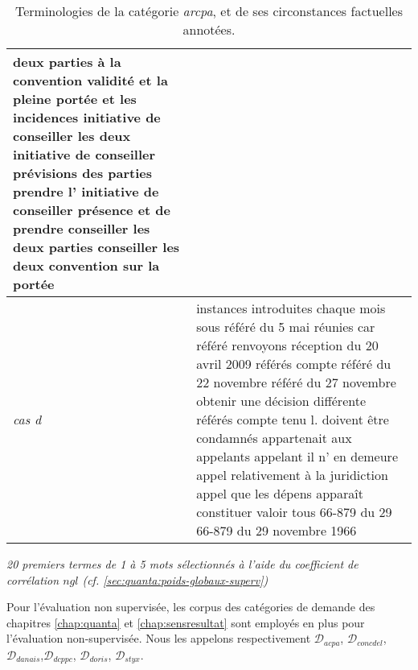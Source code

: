 \begin{table}[h]
\begin{tabular}{|l|p{}|}
		deux parties à la convention
		validité et la pleine
		portée et les incidences
		initiative de conseiller les deux
		initiative de conseiller
		prévisions des parties
		prendre l' initiative de conseiller
		présence et de prendre
		conseiller les deux parties
		conseiller les deux
		convention sur la portée
		\\ \hline
		\textit{cas d} & instances introduites
		chaque mois sous
		référé du 5 mai
		réunies car
		référé renvoyons
		réception du 20 avril 2009
		référés compte
		référé du 22 novembre
		référé du 27 novembre
		obtenir une décision différente
		référés compte tenu
		l. doivent être condamnés
		appartenait aux appelants
		appelant il n' en demeure
		appel relativement à la juridiction
		appel que les dépens
		apparaît constituer
		valoir tous
		66-879 du 29
		66-879 du 29 novembre 1966				 
		\\ \hline
	\end{tabular}

	\textit{20 premiers termes de 1 à 5 mots sélectionnés à l'aide du coefficient de corrélation $ngl$ (cf. \ref{sec:quanta:poids-globaux-superv})}
	\caption{Terminologies  de la catégorie \textit{arcpa}, et de ses circonstances factuelles annotées.}\label{tab:similarite:terminologie-resp_avocat}
\end{table}

Pour l'évaluation non supervisée, les corpus des catégories de demande des chapitres \ref{chap:quanta} et \ref{chap:sensresultat} sont employés en plus pour l'évaluation non-supervisée. Nous les appelons respectivement $\mathcal{D}_{acpa}$, $\mathcal{D}_{concdel}$, $\mathcal{D}_{danais}$,$\mathcal{D}_{dcppc}$, $\mathcal{D}_{doris}$, $\mathcal{D}_{styx}$.

